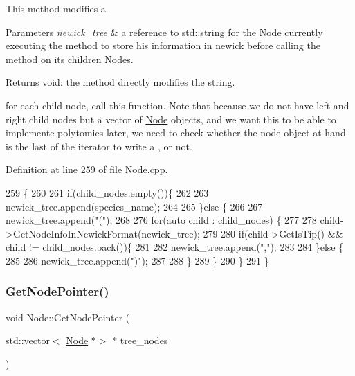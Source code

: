 This method modifies a


\begin{DoxyParams}{Parameters}
{\em newick\+\_\+tree} & a reference to std\+::string for the \hyperlink{classNode}{Node} currently executing the method to store his information in newick before calling the method on its children Nodes.\\
\hline
\end{DoxyParams}
\begin{DoxyReturn}{Returns}
void\+: the method directly modifies the string. 
\end{DoxyReturn}
for each child node, call this function. Note that because we do not have left and right child nodes but a vector of \hyperlink{classNode}{Node} objects, and we want this to be able to implemente polytomies later, we need to check whether the node object at hand is the last of the iterator to write a , or not.

Definition at line 259 of file Node.\+cpp.


\begin{DoxyCode}
259                                                           \{
260   
261   \textcolor{keywordflow}{if}(child\_nodes.empty())\{
262     
263     newick\_tree.append(species\_name);
264     
265   \}\textcolor{keywordflow}{else} \{
266     
267     newick\_tree.append(\textcolor{stringliteral}{"("});
268     
276     \textcolor{keywordflow}{for}(\textcolor{keyword}{auto} child : child\_nodes) \{
277       
278       child->GetNodeInfoInNewickFormat(newick\_tree);
279       
280       \textcolor{keywordflow}{if}(child->GetIsTip() && child != child\_nodes.back())\{
281       
282         newick\_tree.append(\textcolor{stringliteral}{","});
283         
284       \}\textcolor{keywordflow}{else} \{
285         
286         newick\_tree.append(\textcolor{stringliteral}{")"});
287         
288       \}
289     \}
290   \}
291 \}
\end{DoxyCode}
\mbox{\label{classNode_a8e58dc16fc38e2076c7ddbe5b9f04177}} 
\subsubsection{\texorpdfstring{Get\+Node\+Pointer()}{GetNodePointer()}}
{\footnotesize\ttfamily void Node\+::\+Get\+Node\+Pointer (\begin{DoxyParamCaption}\item[{std\+::vector$<$ \hyperlink{classNode}{Node} $\ast$$>$ $\ast$}]{tree\+\_\+nodes }\end{DoxyParamCaption})}



